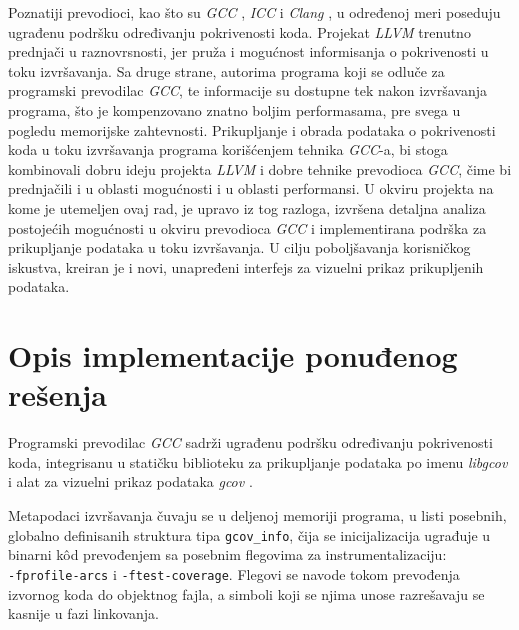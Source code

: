 \documentclass[12pt,oneside]{memoir}
\newcommand{\kod}[1]{\texttt{#1}}
\newcommand{\strano}[1]{\textit{#1}}
\begin{document}
Poznatiji prevodioci, kao što su \strano{GCC} \cite{GCC}, \strano{ICC} \cite{ICC} i \strano{Clang} \cite{CLANG}, u određenoj meri poseduju ugrađenu podršku određivanju pokrivenosti koda. Projekat \strano{LLVM} trenutno prednjači u raznovrsnosti, jer pruža i mogućnost informisanja o pokrivenosti u toku izvršavanja. Sa druge strane, autorima programa koji se odluče za programski prevodilac \strano{GCC}, te informacije su dostupne tek nakon izvršavanja programa, što je kompenzovano znatno boljim performasama, pre svega u pogledu memorijske zahtevnosti. Prikupljanje i obrada podataka o pokrivenosti koda u toku izvršavanja programa korišćenjem tehnika \strano{GCC}-a, bi stoga kombinovali dobru ideju projekta \strano{LLVM} i dobre tehnike prevodioca \strano{GCC}, čime bi prednjačili i u oblasti mogućnosti i u oblasti performansi. U okviru projekta na kome je utemeljen ovaj rad, je upravo iz tog razloga, izvršena detaljna analiza postojećih mogućnosti u okviru prevodioca \strano{GCC} i implementirana podrška za prikupljanje podataka u toku izvršavanja. U cilju poboljšavanja korisničkog iskustva, kreiran je i novi, unapređeni interfejs za vizuelni prikaz prikupljenih podataka.

\section{Opis implementacije ponuđenog rešenja}


Programski prevodilac \strano{GCC} sadrži ugrađenu podršku određivanju pokrivenosti koda, integrisanu u statičku biblioteku za prikupljanje podataka po imenu \strano{libgcov} i alat za vizuelni prikaz podataka \strano{gcov} \cite{GCOV, CodeCoverage}. 

Metapodaci izvršavanja čuvaju se u deljenoj memoriji programa, u listi posebnih, globalno definisanih struktura tipa \kod{gcov\_info}, čija se inicijalizacija ugrađuje u binarni k\^{o}d prevođenjem sa posebnim flegovima za instrumentalizaciju: \\  
\kod{-fprofile-arcs} i \kod{-ftest-coverage}. Flegovi se navode tokom prevođenja izvornog koda do objektnog fajla, a simboli koji se njima unose razrešavaju se kasnije u fazi linkovanja.  
\end{document}

